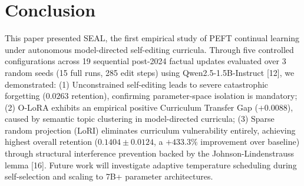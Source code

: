 \documentclass[10pt,journal,compsoc]{IEEEtran}
\begin{document}
\section{Conclusion}
This paper presented SEAL, the first empirical study of PEFT continual learning under autonomous model-directed self-editing curricula. Through five controlled configurations across 19 sequential post-2024 factual updates evaluated over 3 random seeds (15 full runs, 285 edit steps) using Qwen2.5-1.5B-Instruct [12], we demonstrated: (1) Unconstrained self-editing leads to severe catastrophic forgetting ($0.0263$ retention), confirming parameter-space isolation is mandatory; (2) O-LoRA exhibits an empirical positive Curriculum Transfer Gap ($+0.0088$), caused by semantic topic clustering in model-directed curricula; (3) Sparse random projection (LoRI) eliminates curriculum vulnerability entirely, achieving highest overall retention ($0.1404 \pm 0.0124$, a $+433.3\%$ improvement over baseline) through structural interference prevention backed by the Johnson-Lindenstrauss lemma [16]. Future work will investigate adaptive temperature scheduling during self-selection and scaling to 7B+ parameter architectures.
\end{document}
